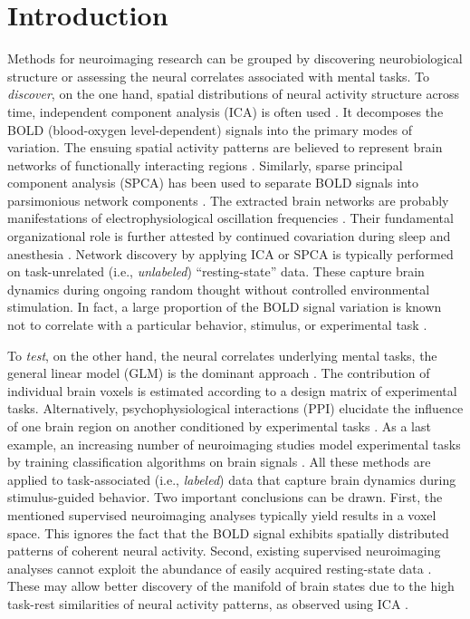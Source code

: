 \documentclass{article} %
\begin{document}
\section{Introduction}
%
Methods for neuroimaging research can be grouped by discovering
neurobiological structure or assessing the neural correlates associated
with mental tasks.
To \textit{discover}, on the one hand,
spatial distributions of neural activity
structure across time,
independent component analysis (ICA) is often used
\cite{beckmann2005}.
It decomposes the BOLD (blood-oxygen level-dependent) signals into the
primary modes of variation.
The ensuing spatial activity patterns are believed to represent
brain networks of
functionally interacting regions \cite{smith2009}.
Similarly, sparse principal component analysis (SPCA)
has been used to
separate BOLD signals into parsimonious network components
\cite{varoqu2011}.
The extracted brain networks are probably
manifestations of electrophysiological oscillation frequencies \cite{hipp15}.
Their fundamental organizational role is further
attested by continued covariation during sleep and anesthesia \cite{fox07}.
%
Network discovery by applying ICA or SPCA is typically performed on
task-unrelated (i.e., \textit{unlabeled}) ``resting-state'' data.
These capture brain dynamics
during ongoing random thought without controlled environmental stimulation.
In fact, a large proportion of the BOLD signal variation
is known
not to correlate with a particular behavior, stimulus, or experimental task
\cite{fox07}. 

To \textit{test}, on the other hand,
the neural correlates underlying mental tasks,
the general linear model (GLM) is the dominant approach \cite{friston94}.
The contribution of
individual brain voxels is estimated
according to a design matrix of experimental tasks.
Alternatively, psychophysiological interactions (PPI)
elucidate the influence of one brain region on another conditioned
by experimental tasks \cite{friston97}.
As a last example, an increasing number of
neuroimaging studies model
experimental tasks by training classification algorithms on brain signals
\cite{poldrack09decoding}.
All these methods are applied to task-associated (i.e., \textit{labeled})
data that capture brain dynamics
during stimulus-guided behavior.
Two important conclusions can be drawn.
First, the mentioned supervised neuroimaging analyses typically yield
results in a voxel space.
This ignores the fact that the BOLD
signal exhibits spatially distributed patterns
of coherent neural activity.
%
Second, existing supervised neuroimaging analyses
cannot exploit the abundance
of easily acquired resting-state data \cite{biswaldiscovery}.
These may allow better discovery of
the manifold of brain states
due to the high task-rest similarities of neural activity patterns,
as observed using ICA \cite{smith2009}.
\end{document}
